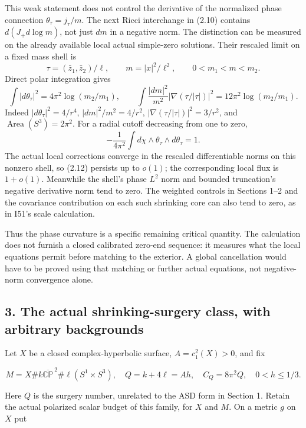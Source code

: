 \documentclass[
  11pt,
]{article}
\begin{document}
This weak statement does not control the derivative of the normalized
phase connection \(\theta_\tau=j_\tau/m\). The next Ricci interchange in
(2.10) contains \(d(J_+d\log m)\), not just \(dm\) in a negative norm.
The distinction can be measured on the already available local actual
simple-zero solutions. Their rescaled limit on a fixed mass shell is \[
 \tau=(\bar z_1,\bar z_2)/\ell,\qquad m=|x|^2/\ell^2,
 \qquad 0<m_1<m<m_2.
\] Direct polar integration gives \[
 \int|d\theta_\tau|^2=4\pi^2\log(m_2/m_1),\qquad
 \int\frac{|dm|^2}{m^2}|\nabla(\tau/|\tau|)|^2
       =12\pi^2\log(m_2/m_1). \tag{2.12}
\] Indeed \(|d\theta_\tau|^2=4/r^4\), \(|dm|^2/m^2=4/r^2\),
\(|\nabla(\tau/|\tau|)|^2=3/r^2\), and
\(\operatorname{Area}(S^3)=2\pi^2\). For a radial cutoff decreasing from
one to zero, \[
 -\frac{1}{4\pi^2}\int d\chi\wedge\theta_\tau\wedge d\theta_\tau=1.
 \tag{2.13}
\] The actual local corrections converge in the rescaled differentiable
norms on this nonzero shell, so (2.12) persists up to \(o(1)\); the
corresponding local flux is \(1+o(1)\). Meanwhile the shell's phase
\(L^2\) norm and bounded truncation's negative derivative norm tend to
zero. The weighted controls in Sections 1--2 and the covariance
contribution on each such shrinking core can also tend to zero, as in
I51's scale calculation.

Thus the phase curvature is a specific remaining critical quantity. The
calculation does not furnish a closed calibrated zero-end sequence: it
measures what the local equations permit before matching to the
exterior. A global cancellation would have to be proved using that
matching or further actual equations, not negative-norm convergence
alone.

\hypertarget{the-actual-shrinking-surgery-class-with-arbitrary-backgrounds}{%
\subsection{3. The actual shrinking-surgery class, with arbitrary
backgrounds}\label{the-actual-shrinking-surgery-class-with-arbitrary-backgrounds}}

Let \(X\) be a closed complex-hyperbolic surface, \(A=c_1^2(X)>0\), and
fix

\[
 M=X\#k\overline{\mathbb{CP}}^{\,2}\#\ell(S^1\times S^3),
 \quad Q=k+4\ell=Ah,\quad C_Q=8\pi^2Q,
 \quad 0<h\le1/3.
\]

Here \(Q\) is the surgery number, unrelated to the ASD form in Section
1. Retain the actual polarized scalar budget of this family, for \(X\)
and \(M\). On a metric \(g\) on \(X\) put
\end{document}
